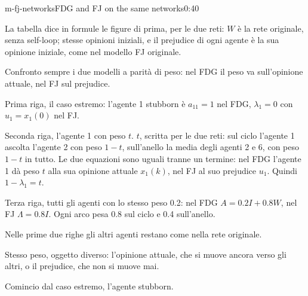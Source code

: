 \begin{slide}{m-fj-networks}{FDG and FJ on the same networks}{0:40 {\color{red}}}
  \begin{discorso}
    \item La tabella dice in formule le figure di prima, per le due reti: $W$ è la rete originale, senza self-loop; stesse opinioni iniziali, e il prejudice di ogni agente è la sua opinione iniziale, come nel modello FJ originale.
    \item Confronto sempre i due modelli a parità di peso: nel FDG il peso va sull'opinione attuale, nel FJ sul prejudice.
    \item Prima riga, il caso estremo: l'agente 1 stubborn è $a_{11}=1$ nel FDG, $\lambda_1=0$ con $u_1=x_1(0)$ nel FJ.
    \item Seconda riga, {\color{red}  } {\color{blue}l'agente 1} con peso {\color{red}$t$.} {\color{blue}$t$, scritta per le due reti: sul ciclo l'agente 1 ascolta l'agente 2 con peso $1-t$, sull'anello la media degli agenti 2 e 6, con peso $1-t$ in tutto.} Le due equazioni sono uguali tranne un termine: nel FDG l'agente 1 dà peso $t$ alla sua opinione attuale $x_1(k)$, nel FJ al suo prejudice $u_1$. Quindi $1-\lambda_1=t$.
    \item Terza riga, tutti gli agenti con lo stesso peso 0.2: nel FDG $A=0.2I+0.8W$, nel FJ $\Lambda=0.8I$. {\color{blue}Ogni arco pesa 0.8 sul ciclo e 0.4 sull'anello.}
    \item Nelle prime due righe gli altri agenti restano come nella rete originale.
    \item Stesso peso, oggetto diverso: l'opinione attuale, che si muove ancora verso gli altri, o il prejudice, che non si muove mai.
    \item Comincio dal caso estremo, l'agente stubborn.
  \end{discorso}
\end{slide}

